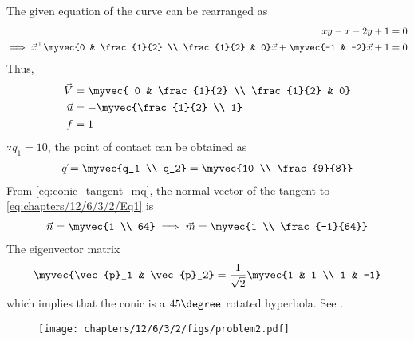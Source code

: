 The given equation of the curve can be rearranged as
\begin{align}
	xy-x-2y+1 &= 0 \\
        \label{eq:chapters/12/6/3/2/Eq1}
	\implies \vec{x}^\top\myvec{0 & \frac{1}{2} \\ \frac{1}{2} & 0}\vec{x} + \myvec{-1 & -2}\vec{x}+1 &= 0 
\end{align}
Thus, 
\begin{align}
	\vec{V} &= \myvec{ 0 & \frac{1}{2} \\ \frac{1}{2} & 0} \\
	\vec{u} &= -\myvec{\frac{1}{2} \\ 1} \\
	f &= 1 
\end{align}
$\because q_1 = 10$, the point of contact can be obtained as
\begin{align}
	 \vec{q} =\myvec{q_1 \\ q_2} = \myvec{10 \\ \frac{9}{8}}
\end{align}
  From \eqref{eq:conic_tangent_mq},
 the normal vector of the tangent to \eqref{eq:chapters/12/6/3/2/Eq1} is
\begin{align}
	\vec{n} = \myvec{1 \\ 64}
	\implies
	\vec{m} = \myvec{1 \\ \frac{-1}{64}}
\end{align}
The eigenvector matrix 
\begin{align}
	\myvec{\vec{p}_1 & \vec{p}_2} = \frac{1}{\sqrt{2}}\myvec{1 & 1 \\ 1 & -1}
\end{align}
which implies that  the conic is a $45\degree$ rotated hyperbola.
See .
\begin{figure}[H]
	\begin{center}
		\texttt{[image: chapters/12/6/3/2/figs/problem2.pdf]}
	\end{center}
\caption{}
\label{fig:chapters/12/6/3/2/Fig1}
\end{figure}
